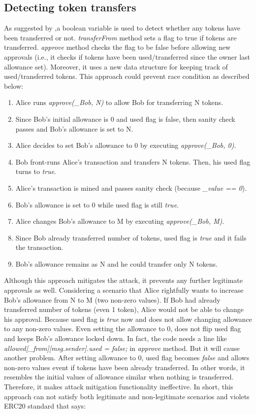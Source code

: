 \subsection{Detecting token transfers}
As suggested by \cite{Ref17},a boolean variable is used to detect whether any tokens have been transferred or not. \textit{transferFrom} method sets a flag to true if tokens are transferred. \textit{approve} method checks the flag to be false before allowing new approvals (i.e., it checks if tokens have been used/transferred since the owner last allowance set). Moreover, it uses a new data structure for keeping track of used/transferred tokens. This approach could prevent race condition as described below:
\begin{enumerate}
	\item Alice runs \textit{approve(\_Bob, N)} to allow Bob for transferring N tokens.
	\item Since Bob’s initial allowance is 0 and used flag is false, then sanity check passes and Bob’s allowance is set to N.
	\item Alice decides to set Bob’s allowance to 0 by executing \textit{approve(\_Bob, 0)}.
	\item Bob front-runs Alice’s transaction and transfers N tokens. Then, his used flag turns to \textit{true}.
	\item Alice’s transaction is mined and passes sanity check (because \textit{\_value == 0}).
	\item Bob’s allowance is set to 0 while used flag is still \textit{true}.
	\item Alice changes Bob’s allowance to M by executing \textit{approve(\_Bob, M)}.
	\item Since Bob already transferred number of tokens, used flag is \textit{true} and it fails the transaction.
	\item Bob’s allowance remains as N and he could transfer only N tokens.\newline
\end{enumerate}
\noindent Although this approach mitigates the attack, it prevents any further legitimate approvals as well. Considering a scenario that Alice rightfully wants to increase Bob’s allowance from N to M (two non-zero values). If Bob had already transferred number of tokens (even 1 token), Alice would not be able to change his approval. Because used flag is \textit{true} now and does not allow changing allowance to any non-zero values. Even setting the allowance to 0, does not flip used flag and keeps Bob’s allowance locked down. In fact, the code needs a line like \textit{allowed[\_from][msg.sender].used = false;} in \textit{approve} method. But it will cause another problem. After setting allowance to 0, used flag becomes \textit{false} and allows non-zero values event if tokens have been already transferred. In other words, it resembles the initial values of allowance similar when nothing is transferred. Therefore, it makes attack mitigation functionality ineffective. In short, this approach can not satisfy both legitimate and non-legitimate scenarios and violets ERC20 standard that says:
